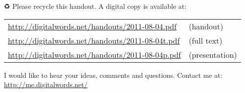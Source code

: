 %
%


\renewcommand{\bibnumberformat}[1]{#1.}
\renewcommand{\biblnfont}{\textscbf}
\renewcommand{\bibfnfont}{\textbf}
\renewcommand{\bibelnfont}{\textscbf}
\renewcommand{\bibefnfont}{\textbf}

%

\vfill

\begin{center}
\begin{extra}
	{♻} Please recycle this handout. A digital copy is available at:\\
	\begin{tabular}{ll}
		\url{http://digitalwords.net/handouts/2011-08-04.pdf} & (handout)\\
		\url{http://digitalwords.net/handouts/2011-08-04t.pdf} & (full text)\\
		\url{http://digitalwords.net/handouts/2011-08-04p.pdf} & (presentation)
	\end{tabular}

	I would like to hear your ideas, comments and questions. Contact me at:\\
	\url{http://me.digitalwords.net/}
\end{extra}
\end{center}
